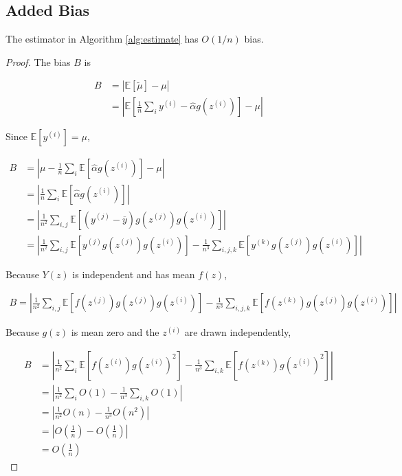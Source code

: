 \subsection{Added Bias}

\begin{prop}[\ref{prop:added_bias}]
The estimator in Algorithm \ref{alg:estimate} has $O(1/n)$ bias.
\end{prop}
\begin{proof}

The bias $B$ is

\begin{align}
B &= \left| \mathbb{E}[\widetilde{\mu}] - \mu \right| \\
&= \left| \mathbb{E}[\frac{1}{n} \sum_i y^{(i)} - \hat{\alpha} g(z^{(i)})] - \mu \right|
\end{align}

Since $\mathbb{E}[y^{(i)}] = \mu$,

\begin{align}
B&= \left| \mu - \frac{1}{n} \sum_i \mathbb{E}[\hat{\alpha} g(z^{(i)})] - \mu \right| \\
&=\left| \frac{1}{n} \sum_i \mathbb{E}[\hat{\alpha} g(z^{(i)})] \right| \\
&=\left| \frac{1}{n^2} \sum_{i,j} \mathbb{E}[(y^{(j)} - \overline{y}) g(z^{(j)}) g(z^{(i)})]\right| \\
&=\left| \frac{1}{n^2} \sum_{i,j} \mathbb{E}[y^{(j)} g(z^{(j)}) g(z^{(i)})] - \frac{1}{n^3} \sum_{i,j,k} \mathbb{E}[y^{(k)} g(z^{(j)}) g(z^{(i)})] \right| 
\end{align}

Because $Y(z)$ is independent and has mean $f(z)$,

\begin{align}
B=\left| \frac{1}{n^2} \sum_{i,j} \mathbb{E}[f(z^{(j)}) g(z^{(j)}) g(z^{(i)})] - \frac{1}{n^3} \sum_{i,j,k} \mathbb{E}[f(z^{(k)}) g(z^{(j)}) g(z^{(i)})] \right| 
\end{align}

Because $g(z)$ is mean zero and the $z^{(i)}$ are drawn independently,

\begin{align}
B &= \left| \frac{1}{n^2} \sum_{i} \mathbb{E}[f(z^{(i)}) g(z^{(i)})^2] - \frac{1}{n^3} \sum_{i,k} \mathbb{E}[f(z^{(k)}) g(z^{(i)})^2] \right| \\
&= \left| \frac{1}{n^2} \sum_{i} O(1) - \frac{1}{n^3} \sum_{i,k} O(1) \right| \\
&= \left| \frac{1}{n^2} O(n) - \frac{1}{n^3} O(n^2) \right| \\
&= \left| O \left(\frac{1}{n} \right) - O \left(\frac{1}{n} \right) \right| \\
&= O \left(\frac{1}{n} \right) 
\end{align}


\end{proof}